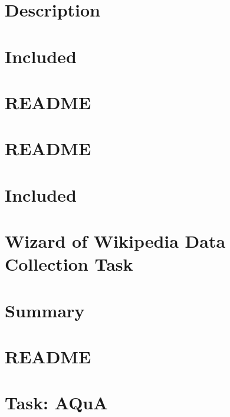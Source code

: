 \documentclass[twoside]{book}
\newcommand{\+}{\discretionary{\mbox{\scriptsize$\hookleftarrow$}}{}{}}
\begin{document}
\chapter{Description}
\label{md_parlai_mturk_core_react_server_README}

\chapter{Included}
\label{md_parlai_mturk_core_README}

\chapter{R\+E\+A\+D\+ME}
\label{md_parlai_mturk_README}

\chapter{R\+E\+A\+D\+ME}
\label{md_parlai_mturk_tasks_personachat_README}

\chapter{Included}
\label{md_parlai_mturk_tasks_README}

\chapter{Wizard of Wikipedia Data Collection Task}
\label{md_parlai_mturk_tasks_wizard_of_wikipedia_README}

\chapter{Summary}
\label{md_parlai_mturk_webapp_README}

\chapter{R\+E\+A\+D\+ME}
\label{md_parlai_README}

\chapter{Task\+: A\+QuA}
\label{md_parlai_tasks_aqua_README}

\end{document}
